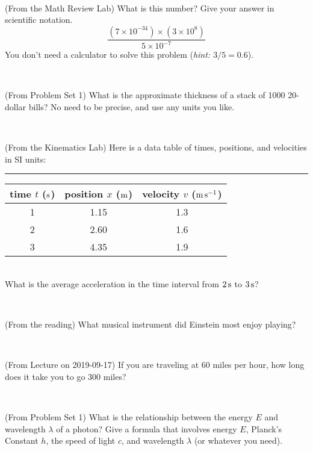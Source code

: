 \documentclass[12pt, letterpaper]{article}
\begin{document}
\vfill ~

\begin{problem} (From the Math Review Lab)
What is this number? Give your answer in scientific notation.
$$
\frac{(7\times10^{-34})\times(3\times10^8)}{5\times10^{-7}}
$$
You don't need a calculator to solve this problem (\textit{hint: $3/5=0.6$}).
\end{problem}


\vfill ~

\begin{problem} (From Problem Set 1)
What is the approximate thickness of a stack of 1000 20-dollar bills?
No need to be precise, and use any units you like.
\end{problem}


\vfill ~

\begin{problem} (From the Kinematics Lab)
Here is a data table of times, positions, and velocities in SI units:\\
\rule{1.0in}{0pt}\begin{tabular}{c|c|c}
time $t$ ($\mathrm{s}$) & position $x$ ($\mathrm{m}$) & velocity $v$ ($\mathrm{m}\,\mathrm{s}^{-1}$) \\
\hline
1 & 1.15 & 1.3 \\
2 & 2.60 & 1.6 \\
3 & 4.35 & 1.9 \\
\hline
\end{tabular}\\
What is the average acceleration in the time interval from $2\,\mathrm{s}$ to $3\,\mathrm{s}$?
\end{problem}


\vfill ~


\clearpage


\begin{problem} (From the reading)
What musical instrument did Einstein most enjoy playing?
\end{problem}


\vfill ~

\begin{problem} (From Lecture on 2019-09-17)
If you are traveling at 60 miles per hour, how long does
it take you to go 300 miles?
\end{problem}


\vfill ~

\begin{problem} (From Problem Set 1)
What is the relationship between the energy $E$ and wavelength
$\lambda$ of a photon? Give a formula that involves energy $E$,
Planck's Constant $h$, the speed of light $c$, and wavelength
$\lambda$ (or whatever you need).
\end{problem}
\end{document}
